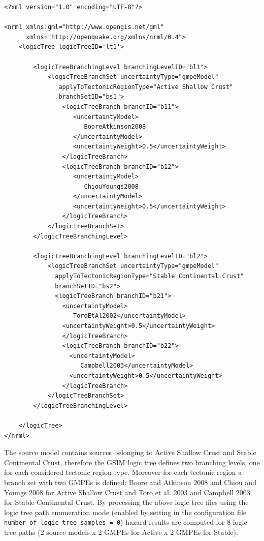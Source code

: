 \begin{Verbatim}[frame=single, commandchars=\\\{\}, fontsize=\normalsize]
<?xml version="1.0" encoding="UTF-8"?>

<nrml xmlns:gml="http://www.opengis.net/gml"
      xmlns="http://openquake.org/xmlns/nrml/0.4">
    <logicTree logicTreeID='lt1'>

        <logicTreeBranchingLevel branchingLevelID="bl1">
            <logicTreeBranchSet uncertaintyType="gmpeModel"
               applyToTectonicRegionType="Active Shallow Crust"
               branchSetID="bs1">
                <logicTreeBranch branchID="b11">
                   <uncertaintyModel>
                      BooreAtkinson2008
                   </uncertaintyModel>
                   <uncertaintyWeight>0.5</uncertaintyWeight>
                </logicTreeBranch>
                <logicTreeBranch branchID="b12">
                   <uncertaintyModel>
                      ChiouYoungs2008
                   </uncertaintyModel>
                   <uncertaintyWeight>0.5</uncertaintyWeight>
                </logicTreeBranch>
            </logicTreeBranchSet>
        </logicTreeBranchingLevel>

        <logicTreeBranchingLevel branchingLevelID="bl2">
            <logicTreeBranchSet uncertaintyType="gmpeModel"
              applyToTectonicRegionType="Stable Continental Crust"
              branchSetID="bs2">
              <logicTreeBranch branchID="b21">
                <uncertaintyModel>
                   ToroEtAl2002</uncertaintyModel>
                <uncertaintyWeight>0.5</uncertaintyWeight>
                </logicTreeBranch>
                <logicTreeBranch branchID="b22">
                  <uncertaintyModel>
                     Campbell2003</uncertaintyModel>
                  <uncertaintyWeight>0.5</uncertaintyWeight>
                </logicTreeBranch>
            </logicTreeBranchSet>
        </logicTreeBranchingLevel>

    </logicTree>
</nrml>
\end{Verbatim}
The source model contains sources belonging to Active Shallow Crust and 
Stable Continental Crust, therefore the
GSIM logic tree defines two branching levels, one for each considered 
tectonic region type. Moreover for each tectonic
region a branch set with two GMPEs is defined: Boore and Atkinson 
2008 and Chiou and Youngs 2008 for Active
Shallow Crust and Toro et al. 2003 and Campbell 2003 for Stable Continental 
Crust. By processing the above logic tree
files using the logic tree path enumeration mode (enabled by setting in the 
configuration file \texttt{number\_\-of\_\-logic\_\-tree\_\-samples = 0})
hazard results are computed for 8 logic tree paths (2 source models x 2 GMPEs
for Active x 2 GMPEs for Stable).\\

